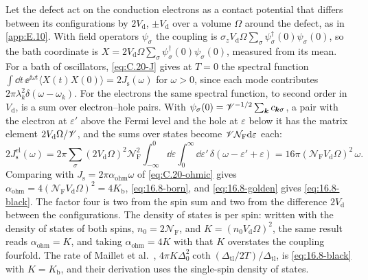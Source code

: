 Let the defect act on the conduction electrons as a contact potential that differs between its configurations by $2V_{\mathrm{d}}$, $\pm V_{\mathrm{d}}$ over a volume $\Omega$ around the defect, as in \cref{app:E.10}. With field operators $\psi_\sigma$ the coupling is $\sigma_zV_{\mathrm{d}}\Omega\sum_\sigma\psi_\sigma^\dagger(0)\psi_\sigma(0)$, so the bath coordinate is $X = 2V_{\mathrm{d}}\Omega\sum_\sigma\psi_\sigma^\dagger(0)\psi_\sigma(0)$, measured from its mean. For a bath of oscillators, \cref{eq:C.20-J} gives at $T = 0$ the spectral function $\int\dd t\,\ee^{\ii\omega t}\langle X(t)X(0)\rangle = 2J_{\mathrm{s}}(\omega)$ for $\omega > 0$, since each mode contributes $2\pi\lambda_k^2\delta(\omega - \omega_k)$. For the electrons the same spectral function, to second order in $V_{\mathrm{d}}$, is a sum over electron--hole pairs. With $\psi_\sigma(0) = \mathscr{V}^{-1/2}\sum_{\bm{k}}c_{\bm{k}\sigma}$, a pair with the electron at $\varepsilon'$ above the Fermi level and the hole at $\varepsilon$ below it has the matrix element $2V_{\mathrm{d}}\Omega/\mathscr{V}$, and the sums over states become $\mathscr{V}\mathcal{N}_{\mathrm{F}}\mathrm{d}\varepsilon$ each:
\begin{equation*}
  2J_{\mathrm{s}}^{\mathrm{el}}(\omega) = 2\pi\sum_\sigma(2V_{\mathrm{d}}\Omega)^2\mathcal{N}_{\mathrm{F}}^2\int_{-\infty}^0\dd\varepsilon\int_0^\infty\dd\varepsilon'\,\delta(\omega - \varepsilon' + \varepsilon)
  = 16\pi(\mathcal{N}_{\mathrm{F}}V_{\mathrm{d}}\Omega)^2\,\omega .
\end{equation*}
Comparing with $J_{\mathrm{s}} = 2\pi\alpha_{\mathrm{ohm}}\omega$ of \cref{eq:C.20-ohmic} gives $\alpha_{\mathrm{ohm}} = 4(\mathcal{N}_{\mathrm{F}}V_{\mathrm{d}}\Omega)^2 = 4K_{\mathrm{b}}$, \cref{eq:16.8-born}, and \cref{eq:16.8-golden} gives \cref{eq:16.8-black}. The factor four is two from the spin sum and two from the difference $2V_{\mathrm{d}}$ between the configurations. The density of states is per spin: written with the density of states of both spins, $n_0 = 2\mathcal{N}_{\mathrm{F}}$, and $K = (n_0V_{\mathrm{d}}\Omega)^2$, the same result reads $\alpha_{\mathrm{ohm}} = K$, and taking $\alpha_{\mathrm{ohm}} = 4K$ with that $K$ overstates the coupling fourfold. The rate of Maillet et al.~\cite[Eq.~(4)]{maillet2023nanomechanical}, $4\pi K\Delta_0^2\coth(\Delta_{\mathrm{tl}}/2T)/\Delta_{\mathrm{tl}}$, is \cref{eq:16.8-black} with $K = K_{\mathrm{b}}$, and their derivation uses the single-spin density of states.

